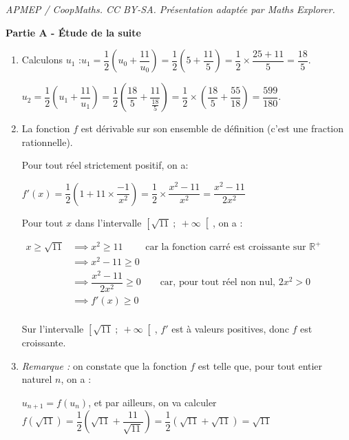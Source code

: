 \documentclass[10pt]{article}
\providecommand{\R}{\mathbb{R}}
\begin{document}
\noindent\textit{APMEP / CoopMaths. CC BY-SA. Présentation adaptée par Maths Explorer.}\par\medskip
\medskip

\textbf{Partie A - Étude de la suite }

\medskip

\begin{enumerate}
\item Calculons $u_{1}$ :\quad $u_1 = \dfrac{1}{2}\left(u_0 + \dfrac{11}{u_0}\right) = \dfrac{1}{2}\left(5 + \dfrac{11}{5}\right) = \dfrac{1}{2}\times \dfrac{25 + 11}{5} = \dfrac{18}{5}$.

 $u_2 = \dfrac{1}{2}\left(u_1 + \dfrac{11}{u_1}\right) = \dfrac{1}{2}\left(\dfrac{18}{5} + \dfrac{11}{\frac{18}{5}}\right) = \dfrac{1}{2}\times \left(\dfrac{18}{5}+\dfrac{55}{18}\right)  = \dfrac{599}{180}$.

\item La fonction $f$ est dérivable sur son ensemble de définition (c'est une fraction rationnelle).

Pour tout réel strictement positif, on a:

$f'(x) = \dfrac{1}{2}\left(1 + 11\times \dfrac{-1}{x^2}\right) = \dfrac{1}{2}\times \dfrac{x^2 - 11}{x^2} = \dfrac{x^2-11}{2x^2}$

Pour tout $x$ dans l'intervalle $\left[\sqrt{11} ~;~+\infty\right[$, on a :

$\begin{aligned} x \geqslant \sqrt{11} &\implies x^2 \geqslant 11 \qquad\text{ car la fonction carré est croissante sur }\R^+\\
&\implies x^2 - 11 \geqslant 0\\
&\implies \dfrac{x^2-11}{2x^2} \geqslant 0 \qquad \text{car, pour tout réel non nul, } 2x^2>0 \\
&\implies f'(x) \geqslant 0\\ \end{aligned}$

Sur l'intervalle $\left[\sqrt{11} ~;~+\infty\right[$, $f'$ est à valeurs positives, donc $f$ est croissante.

\item \emph{Remarque :} on constate que la fonction $f$ est telle que, pour tout entier naturel $n$, on a :

$u_{n+1} = f(u_n)$, et par ailleurs, on va calculer $f\left(\sqrt{11}\right) = \dfrac{1}{2}\left(\sqrt{11} + \dfrac{11}{\sqrt{11}}\right)  = \dfrac{1}{2}\left(\sqrt{11} + \sqrt{11}\right) = \sqrt{11}$


\end{enumerate}
\end{document}
